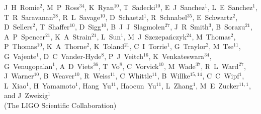 \documentclass[12pt]{iopart}
\begin{document}
{J~H~Romie$^{2}$,  %
M~P~Ross$^{34}$,  %
K~Ryan$^{10}$,  %
T~Sadecki$^{10}$,  %
E~J~Sanchez$^{1}$,  %
L~E~Sanchez$^{1}$,  %
T~R~Saravanan$^{28}$,  %
R~L~Savage$^{10}$,  %
D~Schaetzl$^{1}$,  %
R~Schnabel$^{35}$,  %
E~Schwartz$^{2}$,  %
D~Sellers$^{2}$,  %
T~Shaffer$^{10}$,  %
D~Sigg$^{10}$,  %
B~J~J~Slagmolen$^{27}$,  %
J~R~Smith$^{3}$,  %
B~Sorazu$^{21}$,  %
A~P~Spencer$^{21}$,  %
K~A~Strain$^{21}$,  %
L~Sun$^{1}$,  %
M~J~Szczepa\'nczyk$^{24}$,  %
M~Thomas$^{2}$,  %
P~Thomas$^{10}$,  %
K~A~Thorne$^{2}$,  %
K~Toland$^{21}$,  %
C~I~Torrie$^{1}$,  %
G~Traylor$^{2}$,  %
M~Tse$^{11}$,  %
G~Vajente$^{1}$,  %
D~C~Vander-Hyde$^{8}$,  %
P~J~Veitch$^{16}$,  %
K~Venkateswara$^{34}$,  %
G~Venugopalan$^{1}$,  %
A~D~Viets$^{36}$,  %
T~Vo$^{8}$,  %
C~Vorvick$^{10}$,  %
M~Wade$^{37}$,  %
R~L~Ward$^{27}$,  %
J~Warner$^{10}$,  %
B~Weaver$^{10}$,  %
R~Weiss$^{11}$,  %
C~Whittle$^{11}$,  %
B~Willke$^{15,14}$,  %
C~C~Wipf$^{1}$,  %
L~Xiao$^{1}$,  %
H~Yamamoto$^{1}$,  %
Hang~Yu$^{11}$,  %
Haocun~Yu$^{11}$,  %
L~Zhang$^{1}$,  %
M~E~Zucker$^{11,1}$,  %
and
J~Zweizig$^{1}$%
\\
{(The LIGO Scientific Collaboration)}%
}%
\par\medskip
\address {$^{1}$LIGO, California Institute of Technology, Pasadena, CA 91125, USA }
\address {$^{2}$LIGO Livingston Observatory, Livingston, LA 70754, USA }
\address {$^{3}$California State University Fullerton, Fullerton, CA 92831, USA }
\address {$^{4}$Columbia University, New York, NY 10027, USA }
\address {$^{5}$Louisiana State University, Baton Rouge, LA 70803, USA }
\address {$^{6}$Christopher Newport University, Newport News, VA 23606, USA }
\address {$^{7}$University of Oregon, Eugene, OR 97403, USA }
\address {$^{8}$Syracuse University, Syracuse, NY 13244, USA }
\address {$^{9}$University of Minnesota, Minneapolis, MN 55455, USA }
\address {$^{10}$LIGO Hanford Observatory, Richland, WA 99352, USA }
\address {$^{11}$LIGO, Massachusetts Institute of Technology, Cambridge, MA 02139, USA }
\end{document}
